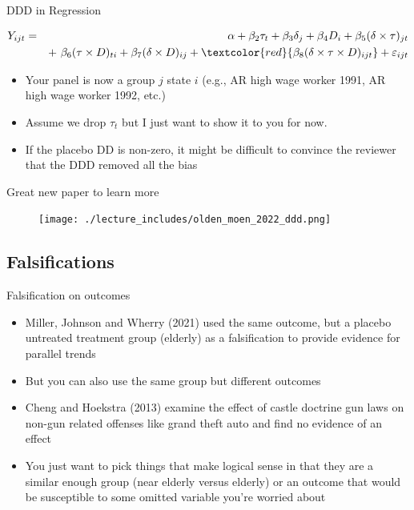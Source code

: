 \documentclass{beamer}
\begin{document}
\begin{frame}{DDD in Regression}
	
	\begin{eqnarray*}
	Y_{ijt} &=&\alpha +  \beta_2 \tau_t + \beta_3 \delta_j  + \beta_4 D_i + \beta_5(\delta \times \tau)_{jt} \\
	&& +\ \beta_6(\tau \times D)_{ti} +  \beta_7(\delta \times D)_{ij} +  \textcolor{red}{\beta_8(\delta \times \tau \times  D)_{ijt}}+  \varepsilon_{ijt}
	\end{eqnarray*}
	
	\begin{itemize}
	\item Your panel is now a group $j$ state $i$ (e.g., AR high wage worker 1991, AR high wage worker 1992, etc.)
	\item Assume we drop $\tau_t$ but I just want to show it to you for now.
	\item If the placebo DD is non-zero, it might be difficult to convince the reviewer that the DDD removed all the bias 
	\end{itemize}
	
\end{frame}

\begin{frame}{Great new paper to learn more}

\begin{figure}
\texttt{[image: ./lecture\_includes/olden\_moen\_2022\_ddd.png]}
\end{figure}

\end{frame}


\subsection{Falsifications}

\begin{frame}{Falsification on outcomes}
	
	\begin{itemize}
	\item Miller, Johnson and Wherry (2021) used the same outcome, but a placebo untreated treatment group (elderly) as a falsification to provide evidence for parallel trends
	\item But you can also use the same group but different outcomes
	\item Cheng and Hoekstra (2013) examine the effect of castle doctrine gun laws on non-gun related offenses like grand theft auto and find no evidence of an effect 
	\item You just want to pick things that make logical sense in that they are a similar enough group (near elderly versus elderly) or an outcome that would be susceptible to some omitted variable you're worried about
	\end{itemize}
\end{frame}
\end{document}
